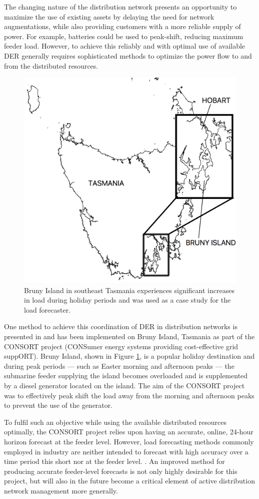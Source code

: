 The changing nature of the distribution network presents an opportunity to maximize the use of existing assets by delaying the need for network augmentations, while also providing customers with a more reliable supply of power.
For example, batteries could be used to peak-shift, reducing maximum feeder load.
However, to achieve this reliably and with optimal use of available DER generally requires sophisticated methods to optimize the power flow to and from the distributed resources.

\begin{figure}[htbp]
	\centerline{\includegraphics[width=.5\textwidth]{images/bruny_island_map.png}}
	\caption{Bruny Island in southeast Tasmania experiences significant increases in load during holiday periods and was used as a case study for the load forecaster.}
	\label{fig:bruny_map}
\end{figure}

One method to achieve this coordination of DER in distribution networks is presented in \cite{Scott2014} and has been implemented on Bruny Island, Tasmania as part of the CONSORT project (CONSumer energy systems providing cost-effective grid suppORT).
Bruny Island, shown in Figure \ref{fig:bruny_map}, is a popular holiday destination and during peak periods --- such as Easter morning and afternoon peaks --- the submarine feeder supplying the island becomes overloaded and is supplemented by a diesel generator located on the island.
The aim of the CONSORT project was to effectively peak shift the load away from the morning and afternoon peaks to prevent the use of the generator.

To fulfil such an objective while using the available distributed resources optimally, the CONSORT project relies upon having an accurate, online, 24-hour horizon forecast at the feeder level.
However, load forecasting methods commonly employed in industry are neither intended to forecast with high accuracy over a time period this short nor at the feeder level. \cite{CIGRE2016}.
An improved method for producing accurate feeder-level forecasts is not only highly desirable for this project, but will also in the future become a critical element of active distribution network management more generally.

